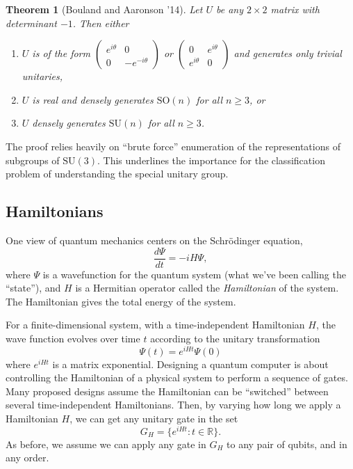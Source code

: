 \documentclass[12pt]{report}
\theoremstyle{plain}
\newtheorem{theorem}{Theorem}[section]
\theoremstyle{definition}
\newcommand{\R}{{\mathbb R}}
\begin{document}
\begin{theorem}[Bouland and Aaronson '14]
Let $U$ be any $2 \times 2$ matrix with determinant $-1$. Then either
\begin{enumerate}
\item $U$ is of the form $\left(\begin{smallmatrix} e^{i\theta} & 0 \\ 0 & -e^{-i\theta} \end{smallmatrix}\right)$ or $\left(\begin{smallmatrix} 0 & e^{i\theta} \\ e^{i\theta} & 0 \end{smallmatrix}\right)$ and generates only trivial unitaries,
\item $U$ is real and densely generates $\mathrm{SO}(n)$ for all $n \geq 3$, or
\item $U$ densely generates $\mathrm{SU}(n)$ for all $n \geq 3$.
\end{enumerate}
\end{theorem}

The proof relies heavily on ``brute force'' enumeration of the representations of subgroups of $\mathrm{SU}(3)$. This underlines the importance for the classification problem of understanding the special unitary group.

\subsection{Hamiltonians}

One view of quantum mechanics centers on the Schr\"{o}dinger equation,
$$
\frac{d \Psi}{dt} = -i H \Psi,
$$
where $\Psi$ is a wavefunction for the quantum system (what we've been calling the ``state''), and $H$ is a Hermitian operator called the \emph{Hamiltonian} of the system. The Hamiltonian gives the total energy of the system.

For a finite-dimensional system, with a time-independent Hamiltonian $H$, the wave function evolves over time $t$ according to the unitary transformation
$$
\Psi(t) = e^{i H t} \Psi(0)
$$
where $e^{i H t}$ is a matrix exponential. Designing a quantum computer is about controlling the Hamiltonian of a physical system to perform a sequence of gates. Many proposed designs assume the Hamiltonian can be ``switched'' between several time-independent Hamiltonians. Then, by varying how long we apply a Hamiltonian $H$, we can get any unitary gate in the set
$$
G_H = \{ e^{iHt} : t \in \R \}.
$$
As before, we assume we can apply any gate in $G_H$ to any pair of qubits, and in any order.
\end{document}
